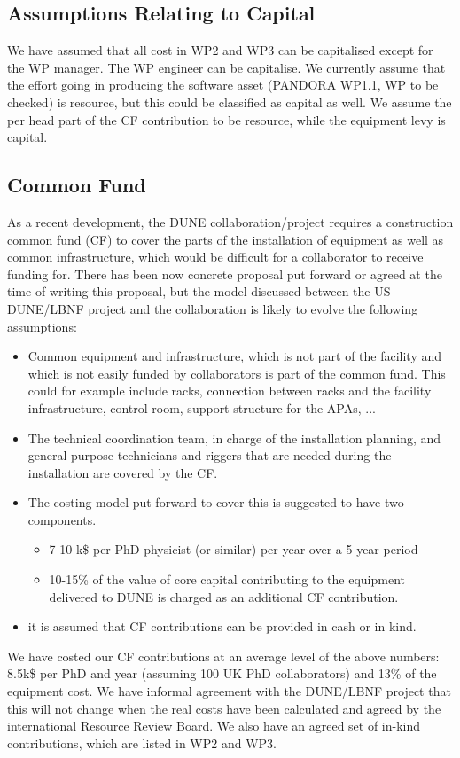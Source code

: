 \subsection{Assumptions Relating to Capital}

We have assumed that all cost in WP2 and WP3 can be capitalised except for the WP manager. The WP engineer can be capitalise.
We currently assume that the effort going in producing the software asset (PANDORA WP1.1, {\color{red} WP to be checked}) is resource, but this could be classified as capital as well. We assume the per head part of the CF contribution to be resource, while the equipment levy is capital.


\subsection{Common Fund}

As a recent development, the DUNE collaboration/project requires a construction common fund (CF) to cover the parts of the installation of equipment as well as common infrastructure, which would be difficult for a collaborator to receive funding for. There has been now concrete proposal put forward or agreed at the time of writing this proposal, but the model discussed between the US DUNE/LBNF project and the collaboration is likely to evolve the following assumptions:
\begin{itemize}
    \item Common equipment and infrastructure, which is not part of the facility and which is not easily funded by collaborators is part of the common fund. This could for example include racks, connection between racks and the facility infrastructure, control room, support structure for the APAs, ...
    \item The technical coordination team, in charge of the installation planning, and general purpose technicians and riggers that are needed during the installation are covered by the CF.
    \item The costing model put forward to cover this is suggested to have two components.
    \begin{itemize}
        \item 7-10 k\$ per PhD physicist (or similar) per year over a 5 year period
        \item 10-15\% of the value of core capital contributing to the equipment delivered to DUNE is charged as an additional CF contribution.
    \end{itemize}
    \item it is assumed that CF contributions can be provided in cash or in kind.
\end{itemize}
We have costed our CF contributions at an average level of the above numbers: 8.5k\$ per PhD and year (assuming 100 UK PhD collaborators) and 13\% of the equipment cost. We have informal agreement with the DUNE/LBNF project that this will not change when the real costs have been calculated and agreed by the international Resource Review Board. We also have an agreed set of in-kind contributions, which are listed in WP2 and WP3.

